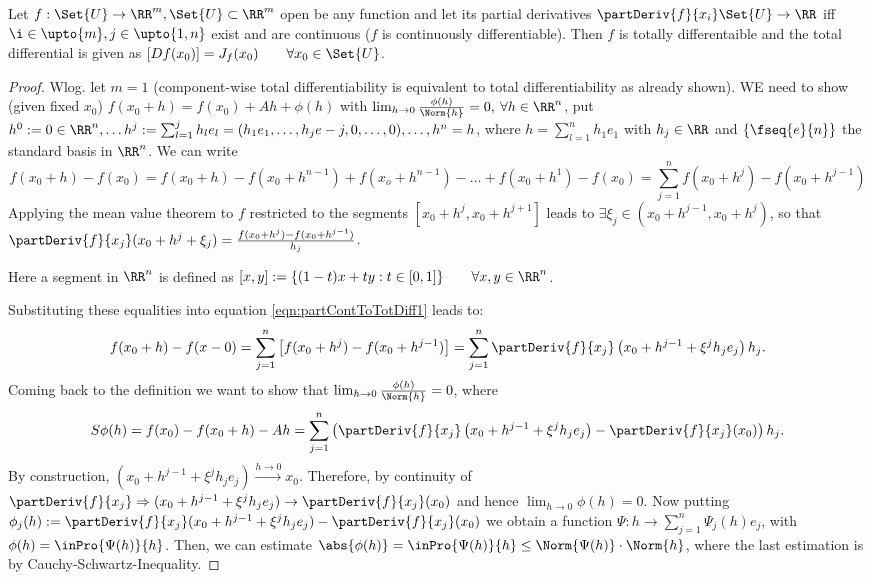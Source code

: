 \begin{thm}
  Let $f:\Set{U}\to\RR^m, \Set{U}\subset\RR^m$ open be any function and let its partial derivatives $\partDeriv{f}{x_i}\Set{U}\to\RR$ iff $\i\in\upto{m}, j\in\upto{1,n}$ exist and are continuous ($f$ is continuously differentiable). Then $f$ is totally differentaible and the total differential is given as $[Df(x_0)]=J_f(x_0)\qquad\forall x_0\in\Set{U}$. 
\end{thm}
\begin{proof}
  Wlog. let $m=1$ (component-wise total differentiability is equivalent to total differentiability as already shown). WE need to show (given fixed $x_0$) $f(x_0+h)=f(x_0)+Ah+\phi(h)$ with $\lim_{h\to 0}\frac{\phi(h)}{\Norm{h}}=0,\:\forall h\in\RR^n$, put $h^0:=0\in\RR^n, \ldots h^j:=\sum_{l=1}^{j}h_le_l=(h_1e_1, \ldots, h_je-j,0,\ldots, 0),\ldots, h^n=h$, where $h=\sum_{l=1}^{n}h_1e_1$ with $h_j\in\RR$ and $\{\fseq{e}{n}\}$ the standard basis in $\RR^n$. We can write \begin{equation}
  	\label{eqn:partContToTotDiff1}
  	f(x_0+h)-f(x_0)=f(x_0+h)-f(x_0+h^{n-1})+f(x_o+h^{n-1})-\ldots+f(x_0+h^1)-f(x_0)=\sum_{j=1}^{n}f(x_0+h^j)-f(x_0+h^{j-1})
  \end{equation}
  Applying the mean value theorem to $f$ restricted to the segments $[x_0+h^j, x_0+h^{j+1}]$ leads to $\exists \xi_j\in(x_0+h^{j-1},x_0+h^j)$, so that $\partDeriv{f}{x_j}(x_0+h^j+\xi_j)=\frac{f(x_0+h^j)-f(x_0+h^{j-1})}{h_j}$. 
  \begin{ldefn}
  	Here a segment in $\RR^n$ is defined as $[x,y]:=\{(1-t)x+ty:t\in[0,1]\}\qquad\forall x, y\in\RR^n$. 
  \end{ldefn}
  Substituting these equalities into equation \ref{eqn:partContToTotDiff1} leads to: \[f(x_0+h)-f(x-0)=\sum_{j=1}^{n}\left[f(x_0+h^j)-f(x_0+h^{j-1})\right]=\sum_{j=1}^{n}\partDeriv{f}{x_j}\left(x_0+h^{j-1}+\xi^jh_je_j\right)h_j.\]
  Coming back to the definition we want to show that $\lim_{h\to 0}\frac{\phi(h)}{\Norm{h}}=0$, where $$S\phi(h)=f(x_0)-f(x_0+h)-Ah=\sum_{j=1}^{n}\left(\partDeriv{f}{x_j}\left(x_0+h^{j-1}+\xi^jh_je_j\right)-\partDeriv{f}{x_j}(x_0)\right)h_j.$$
  By construction, $(x_0+h^{j-1}+\xi^jh_je_j)\overset{h\to 0}{\longrightarrow}x_0$. Therefore, by continuity of $\partDeriv{f}{x_j}\Rightarrow(x_0+h^{j-1}+\xi^jh_je_j)\to\partDeriv{f}{x_j}(x_0)$ and hence $\lim_{h\to 0}\phi(h)=0$. 
  Now putting $\phi_j(h):=\partDeriv{f}{x_j}(x_0+h^{j-1}+\xi^jh_je_j)-\partDeriv{f}{x_j}(x_0)$ we obtain a function $\Psi:h\to\sum_{j=1}^{n}\Psi_j(h)e_j$, with $\phi(h)=\inPro{\Psi(h)}{h}$. Then, we can estimate $\abs{\phi(h)}=\inPro{\Psi(h)}{h}\leq \Norm{\Psi(h)}\cdot\Norm{h}$, where the last estimation is by Cauchy-Schwartz-Inequality. 
  
\end{proof}